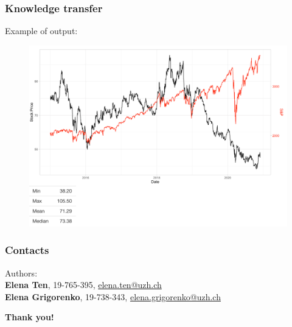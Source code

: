 \documentclass {beamer}
\begin{document}
\begin{frame}
\frametitle{Knowledge transfer}
Example of output:

\begin{figure}[!h]
\includegraphics[scale=0.18]{screenshot2}
\label{fig:ss2}
\end{figure}

\end{frame}

\begin{frame}
\frametitle{Contacts}

Authors:\\
\vspace{5mm}
\textbf{Elena Ten}, 19-765-395, \href{mailto:elena.ten@uzh.ch}{elena.ten@uzh.ch}\\
\textbf{Elena Grigorenko}, 19-738-343, \href{mailto:elena.grigorenko@uzh.ch}{elena.grigorenko@uzh.ch} \\
\vspace{5mm}

\textbf{Thank you!}


\end{frame}
\end{document}
